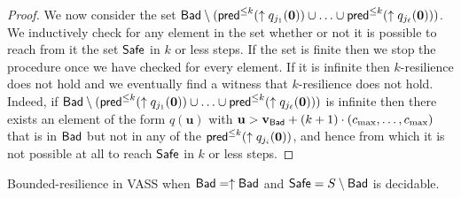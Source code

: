 \begin{proof}
We now consider the set 
$\textsf{Bad} \setminus (\textsf{pred}^{\leq k}(\uparrow q_{j_1}(\textbf{0})) \cup \ldots \cup \textsf{pred}^{\leq k}(\uparrow q_{j_\ell}(\textbf{0})) )$.
We inductively check for any element in the set whether or not it is possible to reach from it the set $\Safe$ in $k$ or less steps.
If the set is finite then we stop the procedure once we have checked for every element.
If it is infinite then
$k$-resilience does not hold 
and we eventually find a witness that $k$-resilience does not hold.
Indeed, 
if
$\textsf{Bad} \setminus (\textsf{pred}^{\leq k}(\uparrow q_{j_1}(\textbf{0})) \cup \ldots \cup \textsf{pred}^{\leq k}(\uparrow q_{j_\ell}(\textbf{0})) )$
is
infinite
then
there exists an element of the form $q(\textbf{u} )$
with $\textbf{u} > \textbf{v}_{\textsf{Bad}} + (k+1) \cdot (c_{\max}, \ldots, c_{\max})$ 
that is in $\textsf{Bad}$ but not in any of the $\textsf{pred}^{\leq k}(\uparrow q_{j_i}(\textbf{0}))$,
and hence from which it is not possible at all to reach
$\Safe$ in $k$ or less steps.
\end{proof}


\iffalse
\mathieu{À priori on devrais avoir la bounded resilience aussi.
En fait, comme on a strong monotony alors
 $\Bad \setminus (\pred^{\leq k}(q_{j_1}(\omega)) \cup \ldots \pred^{\leq k}(q_{j_\ell}(\omega)) )$
 converge vers
  $\Bad \setminus (\pred^{*}(q_{j_1}(\omega)) \cup \ldots \pred^{*}(q_{j_\ell}(\omega)) )$.
  Une fois que le set est stable alors, encore une fois, si il est infini on n'a pas la $k$-résilience
(pour tout $k$ à partir de ce rang là, du coup)
et si il est fini alors on peut vérifier, pour chaque élément, si il est possible d'atteindre
$\Safe$. Si il est possible pour chaque élément alors on prends le maximum des chemins depuis chacun de ces éléments et on fait le max de ça et le $k$ qui permet d'atteindre $\pred^{\leq k} = \pred^*$ pour les $q(\omega)$ ci-dessus et ça nous donne un $k_{\max}$ pour lequel on a la $k_{\max}$-résilience.
Si il est pas possible pour chaque élément alors ça veut dire il y a un élément qui atteindra jamais $\Safe$ et on n'a pas la bounded resilience ni la résilience d'ailleurs. 
Il faut vérifier que c'est possible pour une configuration de vérifier qu'elle est capable d'atteindre $\Safe$ downward closed. 
Normalement c'est le cas d'après Okzan (ils disent c'est équiv du submarking pb).}
\fi


\begin{proposition}
{\sc Bounded-resilience } in VASS when $\textsf{Bad} = \uparrow \textsf{Bad}$ and $\textsf{Safe} = S \setminus \textsf{Bad}$ is decidable. 
\end{proposition}

